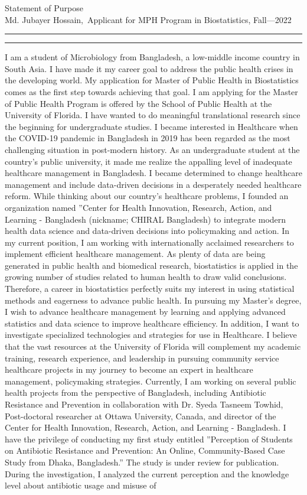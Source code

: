 \documentclass{article}
\newcommand{\soptitle}{Statement of Purpose}
\newcommand{\yourname}{Md. Jubayer Hossain}
\begin{document}
\begin{center}\LARGE\soptitle\\
\large \yourname,\ Applicant for MPH Program in Biostatistics, Fall---2022
\end{center}
\hrule
\vspace{1pt}
\hrule height 1pt
\bigskip

I am a student of Microbiology from Bangladesh, a low-middle income country in South Asia. I have made it my career goal to address the public health crises in the developing world. My application for Master of Public Health in Biostatistics comes as the first step towards achieving that goal. I am applying for the Master of Public Health Program is offered by the School of Public Health at the University of Florida. I have wanted to do meaningful translational research since the beginning for undergraduate studies. I became interested in Healthcare when the COVID-19 pandemic in Bangladesh in 2019 has been regarded as the most challenging situation in post-modern history. As an undergraduate student at the country’s public university, it made me realize the appalling level of inadequate healthcare management in Bangladesh. I became determined to change healthcare management and include data-driven decisions in a desperately needed healthcare reform. While thinking about our country’s healthcare problems, I founded an organization named ”Center for Health Innovation, Research, Action, and Learning - Bangladesh (nickname; CHIRAL Bangladesh) to integrate modern health data science and data-driven decisions into policymaking and action. In my current position, I am working with internationally acclaimed researchers to implement efficient healthcare management. As plenty of data are being generated in public health and biomedical research, biostatistics is applied in the growing number of studies related to human health to draw valid conclusions. Therefore, a career in biostatistics perfectly suits my interest in using statistical methods and eagerness to advance public health. In pursuing my Master’s degree, I wish to advance healthcare management by learning and applying advanced statistics and data science to improve healthcare efficiency. In addition, I want to investigate specialized technologies and strategies for use in Healthcare. I believe that the vast resources at the University of Florida will complement my academic training, research experience, and leadership in pursuing community service healthcare projects in my journey to become an expert in healthcare management, policymaking strategies. Currently, I am working on several public health projects from the perspective of Bangladesh, including Antibiotic Resistance and Prevention in collaboration with Dr. Syeda Tasneem Towhid, Post-doctoral researcher at Ottawa University, Canada, and director of the Center for Health Innovation, Research, Action, and Learning - Bangladesh. I have the privilege of conducting my first study entitled ”Perception of Students on Antibiotic Resistance and Prevention: An Online, Community-Based Case Study from Dhaka, Bangladesh.” The study is under review for publication. During the investigation, I analyzed the current perception and the knowledge level about antibiotic usage and misuse of 
\end{document}
